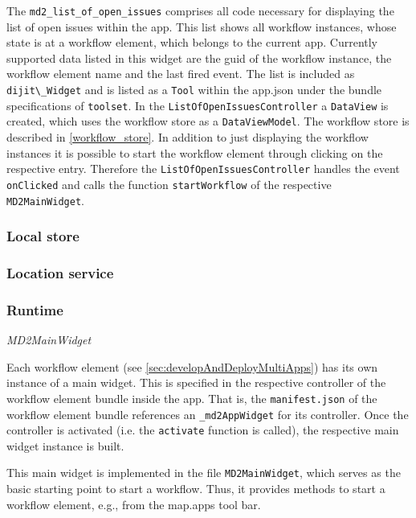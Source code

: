 The \lstinline!md2_list_of_open_issues! comprises all code necessary for displaying the list of open issues within the app. This list shows all workflow instances, whose state is at a workflow element, which belongs to the current app. Currently supported data listed in this widget are the guid of the workflow instance, the workflow element name and the last fired event. 
The list is included as \lstinline!dijit\_Widget! and is listed as a \texttt{Tool} within the app.json under the bundle specifications of \lstinline!toolset!. In the \lstinline!ListOfOpenIssuesController! a \lstinline!DataView! is created, which uses the workflow store as a \lstinline!DataViewModel!. The workflow store is described in \cref{workflow_store}.
In addition to just displaying the workflow instances it is possible to start the workflow element through clicking on the respective entry. Therefore the \lstinline!ListOfOpenIssuesController! handles the event \lstinline!onClicked! and calls the function \lstinline!startWorkflow! of the respective \lstinline!MD2MainWidget!.

\subsubsection{Local store}

\subsubsection{Location service}

\subsubsection{Runtime}

\textit{MD2MainWidget}

Each workflow element (see \ref{sec:developAndDeployMultiApps}) has its own instance of a \MD main widget. This is specified in the respective controller of the workflow element bundle inside the app. That is, the \texttt{manifest.json} of the workflow element bundle references an \texttt{\_md2AppWidget} for its controller. Once the controller is activated (i.e. the \texttt{activate} function is called), the respective \MD main widget instance is built. 

This \MD main widget is implemented in the file \texttt{MD2MainWidget}, which serves as the basic starting point to start a workflow. Thus, it provides methods to start a workflow element, e.g., from the map.apps tool bar.

